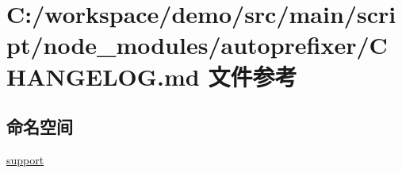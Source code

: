 \hypertarget{autoprefixer_2_c_h_a_n_g_e_l_o_g_8md}{}\section{C\+:/workspace/demo/src/main/script/node\+\_\+modules/autoprefixer/\+C\+H\+A\+N\+G\+E\+L\+OG.md 文件参考}
\label{autoprefixer_2_c_h_a_n_g_e_l_o_g_8md}
\subsection*{命名空间}
\begin{DoxyCompactItemize}
\item 
 \mbox{\hyperlink{namespacesupport}{support}}
\end{DoxyCompactItemize}
